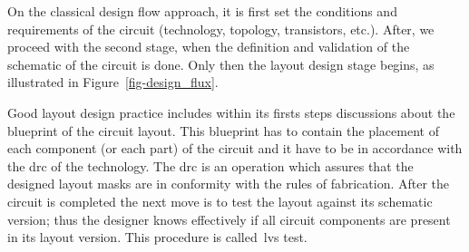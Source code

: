 On the classical design flow approach, it is first set the conditions and requirements of the circuit (technology, topology, transistors, etc.). After, we proceed with the second stage, when the definition and validation of the schematic of the circuit is done. Only then the layout design stage begins, as illustrated in Figure~\ref{fig-design_flux}. 



Good layout design practice includes within its firsts steps discussions about the blueprint of the circuit layout. This blueprint has to contain the placement of each component (or each part) of the circuit and it have to be in accordance with the \gls{drc} of the technology. The \gls{drc} is an operation which assures that the designed layout masks are in conformity with the rules of fabrication. After the circuit is completed the next move is to test the layout against its schematic version; thus the designer knows effectively if all circuit components are present in its layout version. This procedure is called~\gls{lvs} test.


